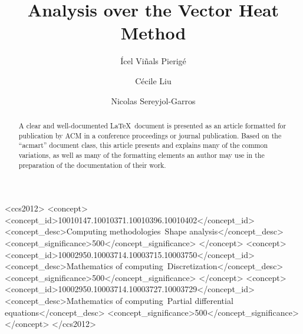 \documentclass[sigconf]{acmart}
\begin{document}
\title{Analysis over the Vector Heat Method}

\author{Ícel Viñals Pierigé}

\author{Cécile Liu}

\author{Nicolas Sereyjol-Garros}


\begin{abstract}
  A clear and well-documented \LaTeX\ document is presented as an
  article formatted for publication by ACM in a conference proceedings
  or journal publication. Based on the ``acmart'' document class, this
  article presents and explains many of the common variations, as well
  as many of the formatting elements an author may use in the
  preparation of the documentation of their work.
\end{abstract}

\begin{CCSXML}
<ccs2012>
   <concept>
       <concept_id>10010147.10010371.10010396.10010402</concept_id>
       <concept_desc>Computing methodologies~Shape analysis</concept_desc>
       <concept_significance>500</concept_significance>
       </concept>
   <concept>
       <concept_id>10002950.10003714.10003715.10003750</concept_id>
       <concept_desc>Mathematics of computing~Discretization</concept_desc>
       <concept_significance>500</concept_significance>
       </concept>
   <concept>
       <concept_id>10002950.10003714.10003727.10003729</concept_id>
       <concept_desc>Mathematics of computing~Partial differential equations</concept_desc>
       <concept_significance>500</concept_significance>
       </concept>
 </ccs2012>
\end{CCSXML}
\end{document}
